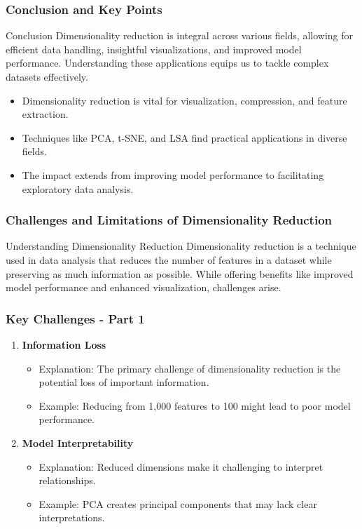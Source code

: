 \documentclass[aspectratio=169]{beamer}
\begin{document}
\begin{frame}[fragile]
  \frametitle{Conclusion and Key Points}
  \begin{block}{Conclusion}
    Dimensionality reduction is integral across various fields, allowing for efficient data handling, insightful visualizations, and improved model performance. Understanding these applications equips us to tackle complex datasets effectively.
  \end{block}
  \begin{itemize}
    \item Dimensionality reduction is vital for visualization, compression, and feature extraction.
    \item Techniques like PCA, t-SNE, and LSA find practical applications in diverse fields.
    \item The impact extends from improving model performance to facilitating exploratory data analysis.
  \end{itemize}
\end{frame}

\begin{frame}[fragile]
  \frametitle{Challenges and Limitations of Dimensionality Reduction}
  \begin{block}{Understanding Dimensionality Reduction}
    Dimensionality reduction is a technique used in data analysis that reduces the number of features in a dataset while preserving as much information as possible. While offering benefits like improved model performance and enhanced visualization, challenges arise.
  \end{block}
\end{frame}

\begin{frame}[fragile]
  \frametitle{Key Challenges - Part 1}
  \begin{enumerate}
    \item \textbf{Information Loss}
      \begin{itemize}
        \item Explanation: The primary challenge of dimensionality reduction is the potential loss of important information.
        \item Example: Reducing from 1,000 features to 100 might lead to poor model performance.
      \end{itemize}
      
    \item \textbf{Model Interpretability}
      \begin{itemize}
        \item Explanation: Reduced dimensions make it challenging to interpret relationships.
        \item Example: PCA creates principal components that may lack clear interpretations.
      \end{itemize}
  \end{enumerate}
\end{frame}
\end{document}
